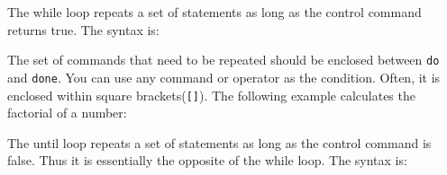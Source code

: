 \begin{Shaded}
\begin{Highlighting}[]
\CommentTok{#}
  
  \NormalTok{+}
 
\end{Highlighting}
\end{Shaded}

The while loop repeats a set of statements as long as the control
command returns true. The syntax is:

\begin{Shaded}
\begin{Highlighting}[]
  
\end{Highlighting}
\end{Shaded}

The set of commands that need to be repeated should be enclosed between
\texttt{do} and \texttt{done}. You can use any command or operator as
the condition. Often, it is enclosed within square
brackets(\texttt{{[}{]}}). The following example calculates the
factorial of a number:

\begin{Shaded}
\begin{Highlighting}[]
\CommentTok{#}
 
 
\NormalTok{[ }  \NormalTok{]}
   \NormalTok{* }
   \OtherTok{))}
 
\end{Highlighting}
\end{Shaded}

The until loop repeats a set of statements as long as the control
command is false. Thus it is essentially the opposite of the while loop.
The syntax is:

\begin{Shaded}
\begin{Highlighting}[]
  
\end{Highlighting}
\end{Shaded}

